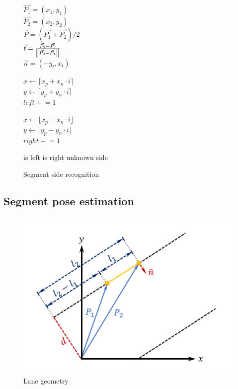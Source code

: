 \documentclass{article}
\begin{document}
\begin{figure} [ht]
\begin{algorithm}[H]
	$\vec{P_1} = (x_1, y_1)$
	\\
	$\vec{P_2} = (x_2, y_2)$
	\\
	$\vec{P} = (\vec{P_1} + \vec{P_2}) / 2$
	\\
	$\vec{t} = \frac{\vec{P_2} - \vec{P_1}}
					{\norm{\vec{P_2} - \vec{P_1}}}$
	\\
	$\vec{n} = (-y_t, x_t)$
	\\
	 {
		$x \gets \lceil x_p + x_n \cdot i \rceil$
		\\
		$y \gets \lceil y_p + y_n \cdot i \rceil$
		\\		
			{
				$left \mathrel{+}= 1$ 
			}
			
		$x \gets \lfloor x_p - x_n \cdot i \rfloor$
		\\
		$y \gets \lfloor y_p - y_n \cdot i \rfloor$
		\\		
			{
				$right \mathrel{+}= 1$ 
			}
	}
	
		{
			\Return is left
		}
		{
			\Return is right
		}
	\uElse
		{
			\Return unknown side
		} 
	\caption{Segment side recognition}
\end{algorithm}
\end{figure}
\FloatBarrier

\subsection{Segment pose estimation}

\begin{figure}[ht]
  \label{fig:lane_geometry}
  \centering
  \includegraphics[scale=1]{graphs/lane_geometry.PNG}
  \caption{Lane geometry}
\end{figure}
\FloatBarrier
\end{document}
